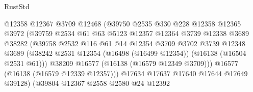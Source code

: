 \begin{lexlean}{RustStd}
\begin{coremodule}
                                    @12358
                                    @12367
                                    @3709
                                    @12468
                                    (@39750
                                      @2535
                                      @330
                                      @228
                                      @12358
                                      @12365
                                      @3972
                                      (@39759
                                        @2534
                                        @61
                                        @63
                                        @5123
                                        @12357
                                        @12364
                                        @3739
                                        @12338
                                        @3689
                                        @38282
                                        (@39758
                                          @2532
                                          @116
                                          @61
                                          @14
                                          @12354
                                          @3709
                                          @3702
                                          @3739
                                          @12348
                                          @3689
                                          (@38242
                                            @2531
                                            @12354
                                            (@16498 (@16499 @12354))
                                            (@16138 (@16504 @2531 @61)))
                                          @38209
                                          @16577
                                          (@16138 (@16579 @12349 @3709)))
                                        @16577
                                        (@16138 (@16579 @12339 @12357)))
                                      @17634
                                      @17637
                                      @17640
                                      @17644
                                      @17649
                                      @39128)
                                    (@39804
                                      @12367
                                      @2558
                                      @2580
                                      @24
                                      @12392

\end{coremodule}
\end{lexlean}
